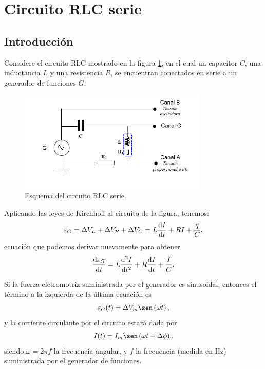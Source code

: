 \documentclass[laboratorio]{guia}
\begin{document}
 
\maketitle


\section{Circuito RLC serie}

\subsection{Introducci\'on}

Considere el circuito RLC mostrado en la figura \ref{fig:circuitoRLCserie}, en el cual un capacitor $C$, una inductancia $L$ y una resistencia $R$, se encuentran conectados en serie a un generador de funciones $G$.

\begin{figure}[hbt!]
    \centering
    \includegraphics[width=9cm]{LG06--000.png}
    \caption{Esquema del circuito RLC serie.}
    \label{fig:circuitoRLCserie}
\end{figure}

Aplicando las leyes de Kirchhoff al circuito de la figura, tenemos:
\begin{equation}
    \varepsilon_G = \Delta V_L + \Delta V_R + \Delta V_C = L \dv{I}{t} + RI + \frac{q}{C},
\end{equation}
ecuación que podemos derivar nuevamente para obtener
\begin{equation}
    \dv{\varepsilon_G}{t} = L \dv[2]{I}{t} + R \dv{I}{t} + \frac{I}{C}.
\end{equation}

Si la fuerza eletromotriz suministrada por el generador es sinusoidal, entonces el término a la izquierda de la última ecuación es
\begin{equation}
    \varepsilon_G(t) = \Delta V_m \sen \left( \omega t \right),
\end{equation}
y la corriente circulante por el circuito estar\'a dada por
\begin{equation}
    I(t) = I_m \sen \left( \omega t + \Delta \phi \right),
\end{equation}
siendo $\omega = 2\pi f$ la frecuencia angular, y $f$ la frecuencia (medida en Hz) suministrada por el generador de funciones. 
\end{document}
